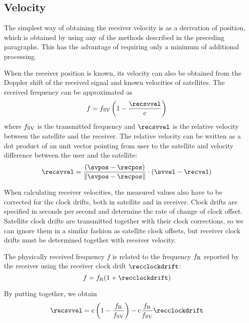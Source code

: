 \subsection{Velocity}
The simplest way of obtaining the receiver velocity is as a derivation of
position, which is obtained by using any of the methods described in the preceding paragraphs.
This has the advantage of requiring only a minimum of additional processing.

When the receiver position is known, its velocity can also be obtained from the Doppler shift of
the received signal and known velocities of satellites.
The received frequency can be approximated as
\begin{equation}
	f = f_\SV \left(1 - \frac{\recsvvel}{\speedoflight}\right)
	\label{eq:doppler}
\end{equation}
where \(f_{\mathrm{SV}}\) is the transmitted frequency and \(\recsvvel\) is the relative velocity
between the satellite and the receiver.
The relative velocity can be written as a dot product of an unit vector pointing
from user to the satellite and velocity difference between the user and the satellite:
\begin{equation}
	\recsvvel = \frac{
		(\svpos - \recpos)
	}{
		\norm{\svpos - \recpos}
	} \cdot (\svvel - \recvel)
	\label{eq:doppler-velocity}
\end{equation}

When calculating receiver velocities, the measured values also have to be corrected for
the clock drifts, both in satellite and in receiver.
Clock drifts are specified in seconds per second and determine the rate of change of clock offset.
Satellite clock drifts are transmitted together with their clock corrections, so we can ignore
them in a similar fashion as satellite clock offsets, but receiver clock drifts must be determined
together with receiver velocity.

The physically received frequency \(f\) is related to the frequency \(f_{\mathrm{R}}\) reported by the receiver
using the receiver clock drift \(\recclockdrift\):
\begin{equation}
	f = f_\REC ( 1 + \recclockdrift)
	\label{eq:doppler-clock-drift}
\end{equation}

By putting 
together, we obtain
\begin{equation}
    \label{eq:doppler2}
	\recsvvel
	=
	\speedoflight \left(1 - \frac{f_\REC}{f_\SV}\right) -
	\speedoflight \frac{f_\REC}{f_\SV} \recclockdrift
\end{equation}

